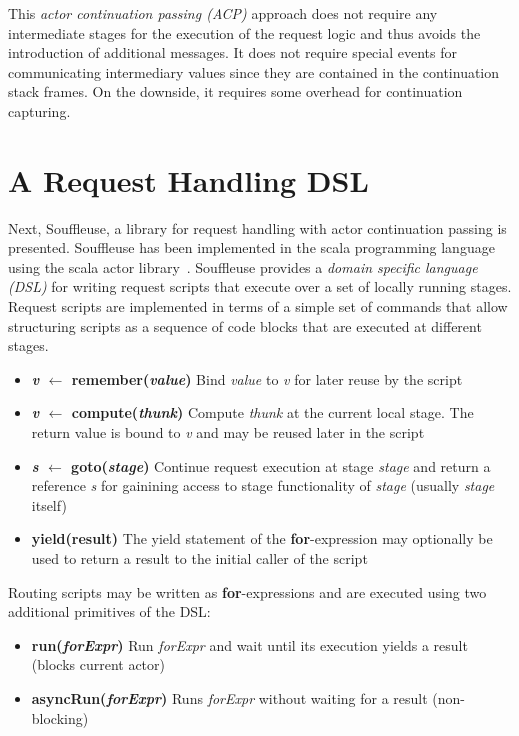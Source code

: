 \documentclass[preprint]{sigplanconf}
\begin{document}
This \emph{actor continuation passing (ACP)} approach does not require any intermediate stages for
the execution of the request logic and thus avoids the introduction of additional messages. It does
not require special events for communicating intermediary values since they are contained in the
continuation stack frames. On the downside, it requires some overhead for continuation capturing.
                         
  
\section{A Request Handling DSL}

Next, Souffleuse, a library for request handling with actor continuation passing is presented.
Souffleuse has been implemented in the scala programming language~\cite{Odersky:2004} using the
scala actor library~\cite{Haller:2007}. Souffleuse provides a \emph{domain specific language (DSL)}
for writing request scripts that execute over a set of locally running stages. Request scripts are
implemented in terms of a simple set of commands that allow structuring scripts as a sequence of
code blocks that are executed at different stages.


\begin{itemize}                                   
	\item \textbf{\emph{v} $\mathbf{\leftarrow}$ remember(\emph{value})} Bind \emph{value} to \emph{v} for later reuse by
	the script
	\item \textbf{\emph{v} $\mathbf{\leftarrow}$ compute(\emph{thunk})} Compute \emph{thunk} at the current local stage.  
	The return value is bound to \emph{v} and may be reused later in the script
	\item \textbf{\emph{s} $\mathbf{\leftarrow}$ goto(\emph{stage})} Continue  request execution at stage \emph{stage} and 
	return a reference \emph{s} for gainining access to stage functionality of \emph{stage} 
	(usually \emph{stage} itself)
	\item \textbf{yield(result)} The yield statement of the \textbf{for}-expression may optionally be used to 
	return a result to the initial caller of the script                           	
\end{itemize}
      

Routing scripts may be written as \textbf{for}-expressions and are executed using two additional
primitives of the DSL:

\begin{itemize}
    \item \textbf{run(\emph{forExpr})} Run \emph{forExpr} and wait until its execution yields a result (blocks current actor)
	\item \textbf{asyncRun(\emph{forExpr})} Runs \emph{forExpr} without waiting for a result (non-blocking)
\end{itemize}	
\end{document}
